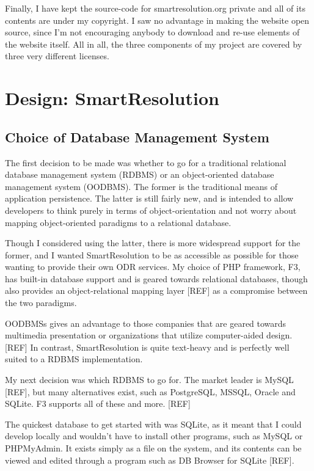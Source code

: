 Finally, I have kept the source-code for smartresolution.org private and all of its contents are under my copyright. I saw no advantage in making the website open source, since I'm not encouraging anybody to download and re-use elements of the website itself. All in all, the three components of my project are covered by three very different licenses.

\section{Design: SmartResolution}

\subsection{Choice of Database Management System}

The first decision to be made was whether to go for a traditional relational database management system (RDBMS) or an object-oriented database management system (OODBMS). The former is the traditional means of application persistence. The latter is still fairly new, and is intended to allow developers to think purely in terms of object-orientation and not worry about mapping object-oriented paradigms to a relational database.

Though I considered using the latter, there is more widespread support for the former, and I wanted SmartResolution to be as accessible as possible for those wanting to provide their own ODR services. My choice of PHP framework, F3, has built-in database support and is geared towards relational databases, though also provides an object-relational mapping layer [REF] as a compromise between the two paradigms. %

OODBMSs gives an advantage to those companies that are geared towards multimedia presentation or organizations that utilize computer-aided design. [REF] In contrast, SmartResolution is quite text-heavy and is perfectly well suited to a RDBMS implementation. %

My next decision was which RDBMS to go for. The market leader is MySQL [REF], but many alternatives exist, such as PostgreSQL, MSSQL, Oracle and SQLite. F3 supports all of these and more. [REF] %

The quickest database to get started with was SQLite, as it meant that I could develop locally and wouldn't have to install other programs, such as MySQL or PHPMyAdmin. It exists simply as a file on the system, and its contents can be viewed and edited through a program such as DB Browser for SQLite [REF]. %

